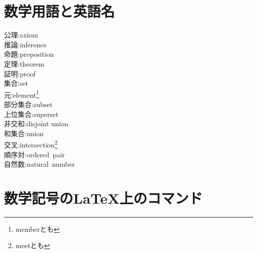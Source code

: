 \documentclass[hyperref,a4paper,12pt]{kininaruki}
\begin{document}
\section{数学用語と英語名}
\begin{multicols*}{3}
\noindent
\hypertarget{axiom}{公理}:axiom\\
\hypertarget{inference}{推論}:inference\\
\hypertarget{proposition}{命題}:proposition\\
\hypertarget{theorem}{定理}:theorem\\
\hypertarget{proof}{証明}:proof\\
\hypertarget{set}{集合}:set\\
\hypertarget{member}{元}:element\footnote{memberとも}\\
\hypertarget{subset}{部分集合}:subset\\
\hypertarget{superset}{上位集合}:superset\\
\hypertarget{dunion}{非交和}:disjoint union\\
\hypertarget{union}{和集合}:union\\
\hypertarget{intersection}{交叉}:intersection\footnote{meetとも}\\
\hypertarget{ordpair}{順序対}:ordered\, pair\\
\hypertarget{natural}{自然数}:natural\, number\\
\end{multicols*}
\newpage
\section{数学記号のLaTeX上のコマンド}
\newpage
{} {}
\printindex
\end{document}
